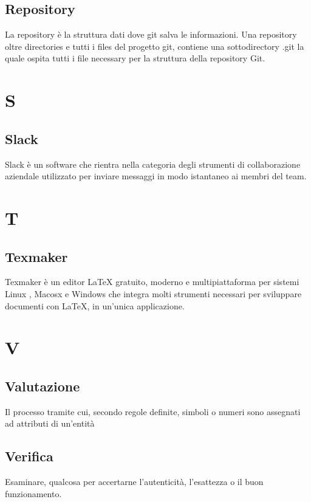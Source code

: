 \documentclass[11pt,a4paper]{article}
\begin{document}
	\subsection{Repository}
	La repository è la struttura dati dove git salva le informazioni. Una repository oltre directories e tutti i files del progetto git, contiene una sottodirectory .git la quale ospita tutti i file necessary per la struttura della repository Git.

	\section{S}
	\subsection{Slack}
	Slack è un software che rientra nella categoria degli strumenti di collaborazione aziendale utilizzato per inviare messaggi in modo istantaneo ai membri del team.
	\section{T}
	\subsection{Texmaker}
	Texmaker è un editor LaTeX gratuito, moderno e multipiattaforma per sistemi Linux , Macosx e Windows che integra molti strumenti necessari per sviluppare documenti con LaTeX, in un'unica applicazione. 
	
	\section{V}
	\subsection{Valutazione}
	Il processo tramite cui, secondo regole definite, simboli o numeri sono assegnati ad attributi di un’entità
	\subsection{Verifica}
	Esaminare, qualcosa per accertarne l’autenticità, l’esattezza o il buon funzionamento.
	
	
\end{document}
